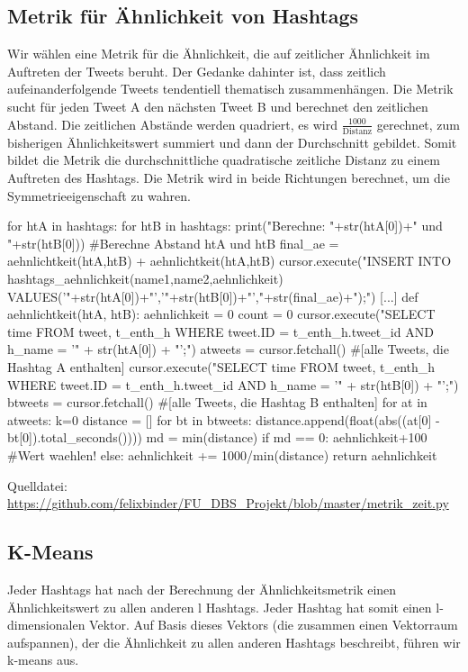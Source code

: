 \documentclass[BCOR0mm,fontsize=12pt,paper=a4,final,numbers=noenddot]{scrartcl}
\begin{document}
\subsection{Metrik für Ähnlichkeit von Hashtags}
Wir wählen eine Metrik für die Ähnlichkeit, die auf zeitlicher Ähnlichkeit im Auftreten der Tweets beruht. Der Gedanke dahinter ist, dass zeitlich aufeinanderfolgende Tweets tendentiell thematisch zusammenhängen. Die Metrik sucht für jeden Tweet A den nächsten Tweet B und berechnet den zeitlichen Abstand. Die zeitlichen Abstände werden quadriert, es wird \(\frac{1000}{\text{Distanz}}\) gerechnet, zum bisherigen Ähnlichkeitswert summiert und dann der Durchschnitt gebildet. Somit bildet die Metrik die durchschnittliche quadratische zeitliche Distanz zu einem Auftreten des Hashtags. Die Metrik wird in beide Richtungen berechnet, um die Symmetrieeigenschaft zu wahren.
\begin{python}
[...]
    for htA in hashtags:
        for htB in hashtags:
            print("Berechne: "+str(htA[0])+" und "+str(htB[0]))
        #Berechne Abstand htA und htB 
            final_ae = aehnlichtkeit(htA,htB) + aehnlichtkeit(htA,htB)
            cursor.execute("INSERT INTO hashtags_aehnlichkeit(name1,name2,aehnlichkeit) VALUES('"+str(htA[0])+"','"+str(htB[0])+"',"+str(final_ae)+");")
   [...]
def aehnlichtkeit(htA, htB):
    aehnlichkeit = 0
    count = 0
    cursor.execute("SELECT time FROM tweet, t_enth_h WHERE tweet.ID = t_enth_h.tweet_id AND h_name = '" + str(htA[0]) + "';")
    atweets = cursor.fetchall() #[alle Tweets, die Hashtag A enthalten]
    cursor.execute("SELECT time FROM tweet, t_enth_h WHERE tweet.ID = t_enth_h.tweet_id AND h_name = '" + str(htB[0]) + "';")
    btweets = cursor.fetchall() #[alle Tweets, die Hashtag B enthalten]
    for at in atweets:
        k=0
        distance = []
        for bt in btweets:
            distance.append(float(abs((at[0] - bt[0]).total_seconds())))
        md = min(distance)
        if md == 0:
            aehnlichkeit+100 #Wert waehlen!
        else: 
            aehnlichkeit += 1000/min(distance)
    return aehnlichkeit
\end{python}
Quelldatei: \url{https://github.com/felixbinder/FU_DBS_Projekt/blob/master/metrik_zeit.py}

\subsection{K-Means}
Jeder Hashtags hat nach der Berechnung der Ähnlichkeitsmetrik einen Ähnlichkeitswert zu allen anderen l Hashtags. Jeder Hashtag hat somit einen l-dimensionalen Vektor. Auf Basis dieses Vektors (die zusammen einen Vektorraum aufspannen), der die Ähnlichkeit zu allen anderen Hashtags beschreibt, führen wir k-means aus.
\end{document}
